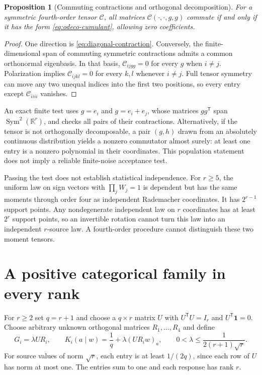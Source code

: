 \documentclass[11pt]{article}
\newtheorem{proposition}[theorem]{Proposition}
\theoremstyle{definition}
\theoremstyle{remark}
\newcommand{\R}{\mathbb R}
\newcommand{\one}{\mathbf 1}
\newcommand{\trans}{\mathsf T}
\DeclareMathOperator{\Sym}{Sym}
\begin{document}
\begin{proposition}[Commuting contractions and orthogonal decomposition]
\label{prop:odeco}
For a symmetric fourth-order tensor $\mathcal C$, all matrices
$\mathcal C(\cdot,\cdot,g,g)$ commute if and only if it has the form
\eqref{eq:odeco-cumulant}, allowing zero coefficients.
\end{proposition}
\begin{proof}
One direction is \eqref{eq:diagonal-contraction}. Conversely, the
finite-dimensional span of commuting symmetric contractions admits a
common orthonormal eigenbasis. In that basis,
$\mathcal C_{ijgg}=0$ for every $g$ when $i\ne j$. Polarization implies
$\mathcal C_{ijkl}=0$ for every $k,l$ whenever $i\ne j$. Full tensor
symmetry can move any two unequal indices into the first two positions,
so every entry except $\mathcal C_{iiii}$ vanishes.
\end{proof}

An exact finite test uses $g=e_i$ and $g=e_i+e_j$, whose matrices $gg^\trans$
span $\Sym^2(\R^r)$, and checks all pairs of their contractions.
Alternatively, if the tensor is not orthogonally decomposable, a pair
$(g,h)$ drawn from an absolutely continuous distribution yields a nonzero
commutator almost surely: at least one entry is a nonzero polynomial in
their coordinates. This population statement does not imply a reliable
finite-noise acceptance test.

Passing the test does not establish statistical independence. For $r\ge5$,
the uniform law on sign vectors with $\prod_jW_j=1$ is dependent but has
the same moments through order four as independent Rademacher coordinates.
It has $2^{r-1}$ support points. Any nondegenerate independent law on $r$
coordinates has at least $2^r$ support points, so an invertible rotation
cannot turn this law into an independent $r$-source law. A fourth-order
procedure cannot distinguish these two moment tensors.

\section{A positive categorical family in every rank}
\label{sec:family}

For $r\ge2$ set $q=r+1$ and choose a $q\times r$ matrix $U$ with
$U^\trans U=I_r$ and $U^\trans\one=0$. Choose arbitrary unknown orthogonal
matrices $R_1,\ldots,R_4$ and define
\begin{equation}
G_i=\lambda UR_i,\qquad
K_i(a\mid w)=\frac1q+\lambda(UR_iw)_a,
\qquad
0<\lambda\le\frac1{2(r+1)\sqrt r}.
\label{eq:positive-family}
\end{equation}
For source values of norm $\sqrt r$, each entry is at least $1/(2q)$,
since each row of $U$ has norm at most one. The entries sum to one and
each response has rank $r$.
\end{document}
